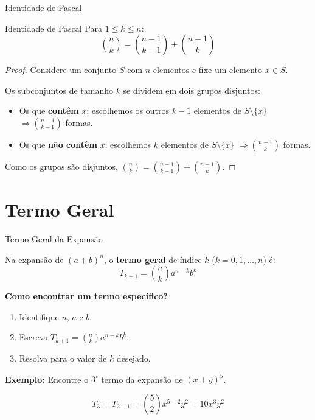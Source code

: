 \documentclass[9pt]{beamer}
\begin{document}

\begin{frame}{Identidade de Pascal}

\begin{block}{Identidade de Pascal}
Para $1 \leq k \leq n$:
\[
\binom{n}{k} = \binom{n-1}{k-1} + \binom{n-1}{k}
\]
\end{block}

\vspace{0.3cm}

\begin{proof}
Considere um conjunto $S$ com $n$ elementos e fixe um elemento $x \in S$.

Os subconjuntos de tamanho $k$ se dividem em dois grupos disjuntos:
\begin{itemize}
    \item Os que \textbf{contêm} $x$: escolhemos os outros $k-1$ elementos de $S \setminus \{x\}$ $\Rightarrow \binom{n-1}{k-1}$ formas.
    \item Os que \textbf{não contêm} $x$: escolhemos $k$ elementos de $S \setminus \{x\}$ $\Rightarrow \binom{n-1}{k}$ formas.
\end{itemize}

Como os grupos são disjuntos, $\binom{n}{k} = \binom{n-1}{k-1} + \binom{n-1}{k}$. \qedhere
\end{proof}
\end{frame}

\section{Termo Geral}

\begin{frame}{Termo Geral da Expansão}

Na expansão de $(a+b)^n$, o \textbf{termo geral} de índice $k$ ($k = 0, 1, \dots, n$) é:
\[
T_{k+1} = \binom{n}{k} a^{n-k} b^{k}
\]

\vspace{0.3cm}

\textbf{Como encontrar um termo específico?}

\begin{enumerate}
    \item Identifique $n$, $a$ e $b$.
    \item Escreva $T_{k+1} = \binom{n}{k} a^{n-k} b^k$.
    \item Resolva para o valor de $k$ desejado.
\end{enumerate}

\vspace{0.3cm}

\textbf{Exemplo:} Encontre o $3^\circ$ termo da expansão de $(x+y)^5$.

\[
T_3 = T_{2+1} = \binom{5}{2} x^{5-2} y^{2} = 10 x^3 y^2
\]
\end{frame}
\end{document}
